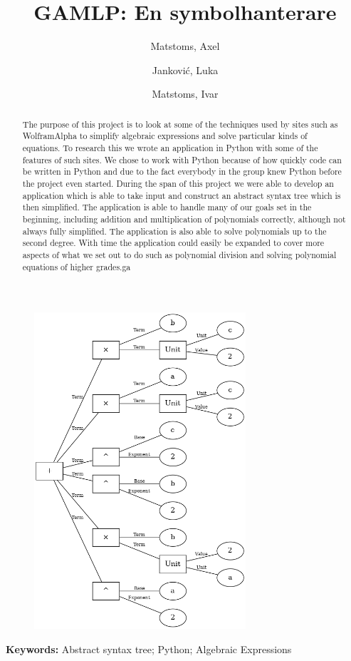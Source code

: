 \documentclass[12pt,a4paper]{article}
\author{
  Matstoms, Axel
  \and
  Jankovi\'{c}, Luka
  \and
  Matstoms, Ivar
}
\title{GAMLP: En symbolhanterare}
\begin{document}
\maketitle
\begin{figure}[h]
  \centering
  \includegraphics[width=0.7\textwidth]{image27}
\end{figure}
\newpage
{}
\begin{abstract}
The purpose of this project is to look at some of the techniques used by sites such as WolframAlpha to simplify algebraic expressions and solve particular kinds of equations. To research this we wrote an application in Python with some of the features of such sites.  We chose to work with Python because of how quickly code can be written in Python and due to the fact everybody in the group knew Python before the project even started. During the span of this project we were able to develop an application which is able to take input and construct an abstract syntax tree which is then simplified. The application is able to handle many of our goals set in the beginning, including addition and multiplication of polynomials correctly, although not always fully simplified. The application is also able to solve polynomials up to the second degree. With time the application could easily be expanded to cover more aspects of what we set out to do such as polynomial division and solving polynomial equations of higher grades.ga
\end{abstract}
\textbf{Keywords:} Abstract syntax tree; Python; Algebraic Expressions
\newpage
\tableofcontents
\newpage
\end{document}
